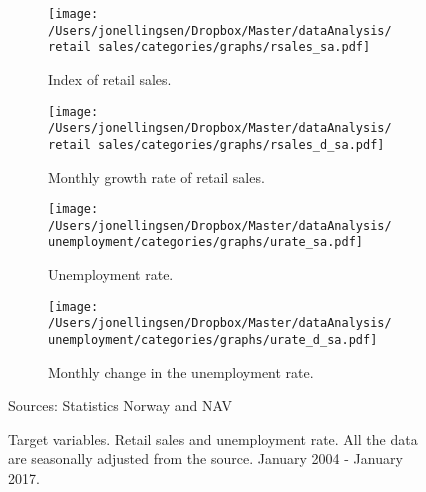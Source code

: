 \begin{figure}[!t]
\centering
\begin{subfigure}[b]{0.45\textwidth}
\caption{Index of retail sales.}\label{rsales_sa}
\texttt{[image: /Users/jonellingsen/Dropbox/Master/dataAnalysis/retail sales/categories/graphs/rsales\_sa.pdf]}
\end{subfigure}
\begin{subfigure}[b]{0.45\textwidth}
\caption{Monthly growth rate of retail sales.}\label{rsales_d_sa}
\texttt{[image: /Users/jonellingsen/Dropbox/Master/dataAnalysis/retail sales/categories/graphs/rsales\_d\_sa.pdf]}
\end{subfigure}
\begin{subfigure}[b]{0.45\textwidth}
\caption{Unemployment rate.}\label{urate_sa}
\texttt{[image: /Users/jonellingsen/Dropbox/Master/dataAnalysis/unemployment/categories/graphs/urate\_sa.pdf]}
\end{subfigure}
\begin{subfigure}[b]{0.45\textwidth}
\caption{Monthly change in the unemployment rate.}\label{urate_d_sa}
\texttt{[image: /Users/jonellingsen/Dropbox/Master/dataAnalysis/unemployment/categories/graphs/urate\_d\_sa.pdf]}
\end{subfigure}
\caption*{Sources: Statistics Norway and NAV}
\caption{Target variables. Retail sales and unemployment rate. All the data are seasonally adjusted from the source. January 2004 - January 2017.}
\label{fig:target}
\end{figure}

